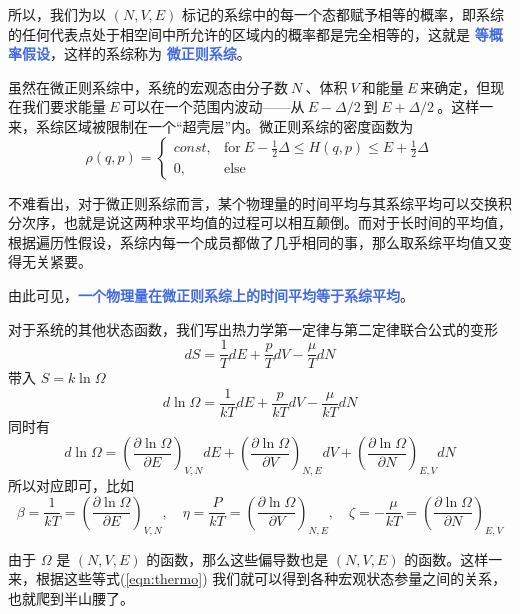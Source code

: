 \documentclass[hyperref,UTF-8]{ctexart}
\newcommand{\0}{\boldsymbol{0}}
\begin{document}
所以，我们为以 $(N,V,E)$ 标记的系综中的每一个态都赋予相等的概率，即系综的任何代表点处于相空间中所允许的区域内的概率都是完全相等的，这就是 \textcolor{RoyalBlue}{\textbf{\kaishu 等概率假设}}，这样的系综称为 \textcolor{RoyalBlue}{\textbf{\kaishu 微正则系综}}。

虽然在微正则系综中，系统的宏观态由分子数$~N~$、体积$~V~$和能量$~E~$来确定，但现在我们要求能量$~E~$可以在一个范围内波动——从$~E -\Delta/2~$到$~E + \Delta/2~$。这样一来，系综区域被限制在一个“超壳层”内。微正则系综的密度函数为
\begin{equation}
\rho(q, p) = \begin{cases}const, & \text{for}~E - \displaystyle\frac{1}{2}\Delta \le H(q, p) \le E + \displaystyle\frac{1}{2}\Delta \\
0, &\text{else}
\end{cases}
\end{equation}

不难看出，对于微正则系综而言，某个物理量的时间平均与其系综平均可以交换积分次序，也就是说这两种求平均值的过程可以相互颠倒。而对于长时间的平均值，根据遍历性假设，系综内每一个成员都做了几乎相同的事，那么取系综平均值又变得无关紧要\cite{Pathria}。

由此可见，\textcolor{RoyalBlue}{\textbf{\kaishu 一个物理量在微正则系综上的时间平均等于系综平均}}。

对于系统的其他状态函数，我们写出热力学第一定律与第二定律联合公式的变形
\[
    dS = \frac{1}{T} dE + \frac{p}{T} dV - \frac{\mu}{T} dN
\]
带入 $S = k \ln \Omega$ 
\begin{equation}
    d\ln \Omega = \frac{1}{kT} dE + \frac{p}{kT} dV - \frac{\mu}{kT} dN
\end{equation}
同时有
\begin{equation}
    d\ln \Omega = \left(\frac{\partial \ln \Omega}{\partial E}\right)_{V,N} dE + \left(\frac{\partial \ln \Omega}{\partial V}\right)_{N,E} dV + \left(\frac{\partial \ln \Omega}{\partial N}\right)_{E,V} dN
\end{equation}
所以对应即可，比如
\begin{equation}\label{eqn:thermo}
    \beta = \frac{1}{kT} =  \left(\frac{\partial \ln \Omega}{\partial E}\right)_{V,N},\quad \eta  = \frac{P}{kT}  = \left(\frac{\partial \ln \Omega}{\partial V}\right)_{N,E},\quad \zeta = -\frac{\mu}{kT}  = \left(\frac{\partial \ln \Omega}{\partial N}\right)_{E,V}
\end{equation}

由于 $\Omega$ 是 $(N,V,E)$ 的函数，那么这些偏导数也是 $(N,V,E)$ 的函数。这样一来，根据这些等式(\ref*{eqn:thermo}) 我们就可以得到各种宏观状态参量之间的关系，也就爬到半山腰了。
\end{document}
